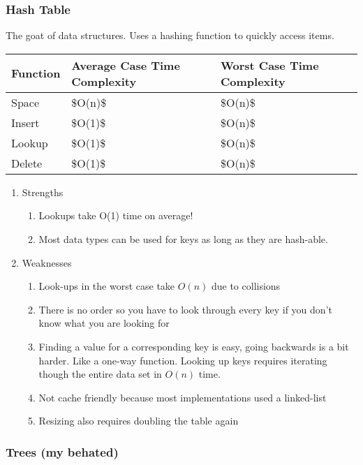 \documentclass{article}
\begin{document}
 \subsubsection{Hash Table} 
 
 
The goat of data structures. Uses a hashing function to quickly access items. 
 

 \begin{table}[!ht]
    \centering
    \begin{tabular}{|l|l|l|}
    \hline
        Function & Average Case Time Complexity & Worst Case Time Complexity \\ \hline
        Space & \$O(n)\$ & \$O(n)\$ \\ \hline
        Insert & \$O(1)\$ & \$O(n)\$ \\ \hline
        Lookup & \$O(1)\$ & \$O(n)\$ \\ \hline
        Delete & \$O(1)\$ & \$O(n)\$ \\ \hline
    \end{tabular}
\end{table}

\begin{enumerate}
    \item Strengths
    \begin{enumerate}
        \item Lookups take O(1) time on average!
        \item Most data types can be used for keys as long as they are hash-able.
    \end{enumerate}
    \item Weaknesses
    \begin{enumerate}   
        \item Look-ups in the worst case take $O(n)$ due to collisions
        \item There is no order so you have to look through every key if you don't know what you are looking for
        \item Finding a value for a corresponding key is easy, going backwards is a bit harder. Like a one-way function. Looking up keys requires iterating though the entire data set in $O(n)$ time.
        \item Not cache friendly because most implementations used a linked-list
        \item Resizing also requires doubling the table again
    \end{enumerate}
\end{enumerate}

\subsubsection{Trees (my behated)}
\end{document}
